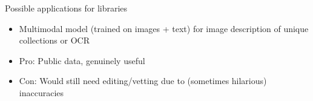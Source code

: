 \documentclass[handout]{beamer} %
\begin{document}
\begin{frame}{Possible applications for libraries}
	\begin{itemize}
		\item Multimodal model (trained on images + text) for image description of unique collections or OCR
		\pause
		\item Pro: Public data, genuinely useful
		\pause
		\item Con: Would still need editing/vetting due to (sometimes hilarious) inaccuracies
		
	\end{itemize}
\end{frame}

\begin{frame}[plain]
\end{frame}

\begin{frame}[plain]
\end{frame}

\begin{frame}[plain]
\end{frame}
\end{document}
